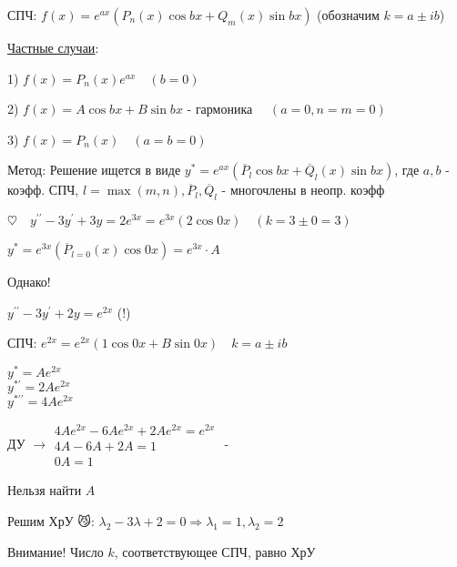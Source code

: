\documentclass[12pt]{article}
\begin{document}
    \Def СПЧ: $\displaystyle f(x) = e^{ax} (P_n(x)\cos bx + Q_m (x)\sin bx)$ (обозначим $k = a \pm ib$)

    \underline{Частные случаи}:

    1) $\displaystyle f(x) = P_n(x) e^{ax} \quad (b = 0)$

    2) $f(x) = A\cos b x + B \sin bx$ - гармоника $\quad (a = 0, n = m = 0)$

    3) $\displaystyle f(x) = P_n(x) \quad (a = b = 0)$

    Метод: Решение ищется в виде $\displaystyle y^* = e^{ax} (\overline{P}_l \cos bx + \overline{Q}_l (x) \sin bx)$,
    где $a, b$ - коэфф. СПЧ, $\displaystyle l = \max(m, n), \overline{P}_l, \overline{Q}_l$ - многочлены в неопр. коэфф

     $\displaystyle \heartsuit \quad y^{\prime\prime} - 3y^\prime + 3y = 2e^{3x} = e^{3x} (2 \cos 0x) \quad (k = 3 \pm 0 = 3)$

    $\displaystyle y^* = e^{3x} (\overline{P}_{l = 0} (x) \cos 0x) = e^{3x} \cdot A$

     Однако!

    $\displaystyle y^{\prime\prime} - 3y^\prime + 2y = e^{2x}$ (!)

    СПЧ: $\displaystyle e^{2x} = e^{2x} (1 \cos 0x + B \sin 0x) \quad k = a \pm ib$

    \begin{rcases*}
    $\displaystyle y^* = Ae^{2x}$ \\

    $\displaystyle y^{*\prime} = 2Ae^{2x}$ \\

    $\displaystyle y^{*\prime\prime} = 4Ae^{2x}$ \\
    \end{rcases*} ДУ $\displaystyle \longrightarrow \begin{matrix}4Ae^{2x} - 6Ae^{2x} + 2Ae^{2x} = e^{2x} \\ 4A - 6A + 2A = 1 \\ 0A = 1\end{matrix}$ - {\Huge 🤯}

    Нельзя найти $A$

    Решим ХрУ 😼: $\displaystyle \lambda_2 - 3\lambda + 2 = 0 \Longrightarrow \lambda_1 = 1, \lambda_2 = 2$

    Внимание! Число $k$, соответствующее СПЧ, равно ХрУ \Cat

    \vspace{5mm}
\end{document}
